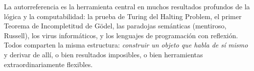 \documentclass[11pt,a4paper]{article}
\theoremstyle{definicion}
\begin{document}
\begin{intuicion}
La autorreferencia es la herramienta central en muchos resultados profundos de la lógica y la computabilidad: la prueba de Turing del Halting Problem, el primer Teorema de Incompletitud de Gödel, las paradojas semánticas (mentiroso, Russell), los virus informáticos, y los lenguajes de programación con reflexión. Todos comparten la misma estructura: \emph{construir un objeto que habla de sí mismo} y derivar de allí, o bien resultados imposibles, o bien herramientas extraordinariamente flexibles.
\end{intuicion}
\end{document}
